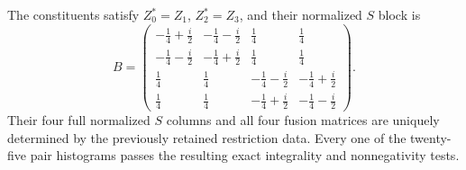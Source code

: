 \begin{proposition}
\label{prop:creative-r1154-packet}
The constituents satisfy $Z_0^*=Z_1$, $Z_2^*=Z_3$, and their normalized
$S$ block is
\[
 B=\begin{pmatrix}
 -\frac14+\frac i2&-\frac14-\frac i2&\frac14&\frac14\\
 -\frac14-\frac i2&-\frac14+\frac i2&\frac14&\frac14\\
 \frac14&\frac14&-\frac14-\frac i2&-\frac14+\frac i2\\
 \frac14&\frac14&-\frac14+\frac i2&-\frac14-\frac i2
 \end{pmatrix}.
\]
Their four full normalized $S$ columns and all four fusion matrices are uniquely
determined by the previously retained restriction data. Every one of
the twenty-five pair histograms passes the resulting exact integrality
and nonnegativity tests.
\end{proposition}
